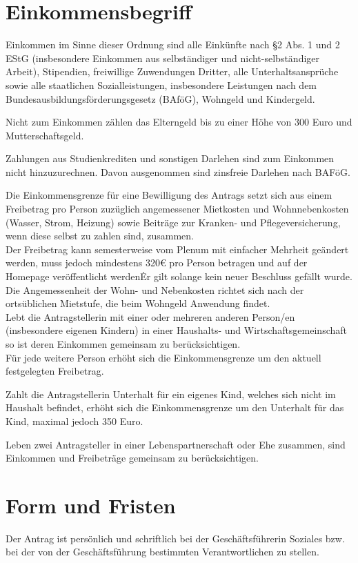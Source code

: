 \begin{multicols}{2}
\section{Einkommensbegriff}
\Abs \Satz Einkommen im Sinne dieser Ordnung sind alle Einkünfte nach §2 Abs. 1 und 2 EStG (insbesondere Einkommen aus selbständiger und nicht-selbständiger Arbeit), Stipendien, freiwillige Zuwendungen Dritter, alle Unterhaltsansprüche sowie alle staatlichen Sozialleistungen, insbesondere Leistungen nach dem Bundesausbildungsförderungsgesetz (BAföG), Wohngeld und Kindergeld.

\Abs \Satz Nicht zum Einkommen zählen das Elterngeld bis zu einer Höhe von 300 Euro und Mutterschaftsgeld.

\Abs \Satz Zahlungen aus Studienkrediten und sonstigen Darlehen sind zum Einkommen nicht hinzuzurechnen. Davon ausgenommen sind zinsfreie Darlehen nach BAFöG.

\Abs \Satz Die Einkommensgrenze für eine Bewilligung des Antrags setzt sich aus einem Freibetrag pro Person zuzüglich angemessener Mietkosten und Wohnnebenkosten (Wasser, Strom, Heizung) sowie Beiträge zur Kranken- und Pflegeversicherung, wenn diese selbst zu zahlen sind, zusammen.\\
\Satz Der Freibetrag kann semesterweise vom Plenum mit einfacher Mehrheit geändert werden, muss jedoch mindestens 320€ pro Person betragen und auf der Homepage veröffentlicht werden\. Er gilt solange kein neuer Beschluss gefällt wurde. \\
\Satz Die Angemessenheit der Wohn- und Nebenkosten richtet sich nach der ortsüblichen Mietstufe, die beim Wohngeld Anwendung findet. \\
\Satz  Lebt die Antragstellerin mit einer oder mehreren anderen Person/en (insbesondere eigenen Kindern) in einer Haushalts- und Wirtschaftsgemeinschaft so ist deren Einkommen gemeinsam zu berücksichtigen.\\
\Satz Für jede weitere Person erhöht sich die Einkommensgrenze um den aktuell festgelegten Freibetrag.

\Abs \Satz Zahlt die Antragstellerin Unterhalt für ein eigenes Kind, welches sich nicht im Haushalt befindet, erhöht sich die Einkommensgrenze um den Unterhalt für das Kind, maximal jedoch 350 Euro.

\Abs \Satz Leben zwei Antragsteller in einer Lebenspartnerschaft oder Ehe zusammen, sind Einkommen und Freibeträge gemeinsam zu berücksichtigen.

\section{Form und Fristen}
\Abs \Satz Der Antrag ist persönlich und schriftlich bei der Geschäftsführerin Soziales bzw. bei der von der Geschäftsführung bestimmten Verantwortlichen zu stellen.


\end{multicols}
